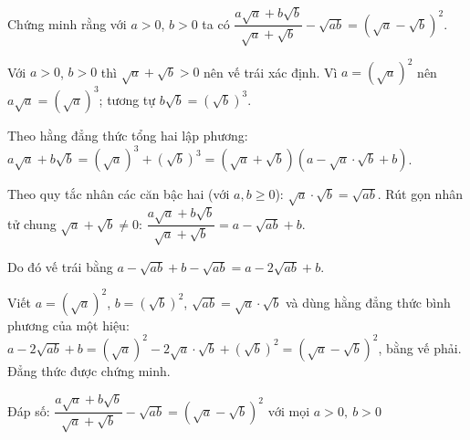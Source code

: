 \begin{problem}[9DS-CAN-017]
Chứng minh rằng với $a > 0$, $b > 0$ ta có $\dfrac{a\sqrt{a} + b\sqrt{b}}{\sqrt{a} + \sqrt{b}} - \sqrt{ab} = (\sqrt{a} - \sqrt{b})^2$.

\begin{solution}
Với $a > 0$, $b > 0$ thì $\sqrt{a} + \sqrt{b} > 0$ nên vế trái xác định. Vì $a = (\sqrt{a})^2$ nên $a\sqrt{a} = (\sqrt{a})^3$; tương tự $b\sqrt{b} = (\sqrt{b})^3$.

Theo hằng đẳng thức tổng hai lập phương: $a\sqrt{a} + b\sqrt{b} = (\sqrt{a})^3 + (\sqrt{b})^3 = (\sqrt{a} + \sqrt{b})(a - \sqrt{a} \cdot \sqrt{b} + b)$.

Theo quy tắc nhân các căn bậc hai (với $a, b \geq 0$): $\sqrt{a} \cdot \sqrt{b} = \sqrt{ab}$. Rút gọn nhân tử chung $\sqrt{a} + \sqrt{b} \neq 0$: $\dfrac{a\sqrt{a} + b\sqrt{b}}{\sqrt{a} + \sqrt{b}} = a - \sqrt{ab} + b$.

Do đó vế trái bằng $a - \sqrt{ab} + b - \sqrt{ab} = a - 2\sqrt{ab} + b$.

Viết $a = (\sqrt{a})^2$, $b = (\sqrt{b})^2$, $\sqrt{ab} = \sqrt{a} \cdot \sqrt{b}$ và dùng hằng đẳng thức bình phương của một hiệu: $a - 2\sqrt{ab} + b = (\sqrt{a})^2 - 2\sqrt{a} \cdot \sqrt{b} + (\sqrt{b})^2 = (\sqrt{a} - \sqrt{b})^2$, bằng vế phải. Đẳng thức được chứng minh.

Đáp số: $\boxed{\dfrac{a\sqrt{a} + b\sqrt{b}}{\sqrt{a} + \sqrt{b}} - \sqrt{ab} = (\sqrt{a} - \sqrt{b})^2 \text{ với mọi } a > 0,\ b > 0}$
\end{solution}
\end{problem}

